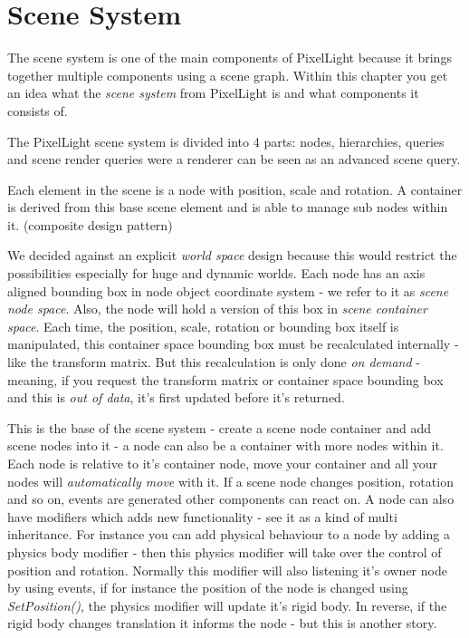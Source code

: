 \section{Scene System}
The scene system is one of the main components of PixelLight because it brings together multiple components using a scene graph. Within this chapter you get an idea what the \emph{scene system} from PixelLight is and what components it consists of.

The PixelLight scene system is divided into 4 parts: nodes, hierarchies, queries and scene render queries were a renderer can be seen as an advanced scene query.

Each element in the scene is a node with position, scale and rotation. A container is derived from this base scene element and is able to manage sub nodes within it. (composite design pattern)

We decided against an explicit \emph{world space} design because this would restrict the possibilities especially for huge and dynamic worlds. Each node has an axis aligned bounding box in node object coordinate system - we refer to it as \emph{scene node space}. Also, the node will hold a version of this box in \emph{scene container space}. Each time, the position, scale, rotation or bounding box itself is manipulated, this container space bounding box must be recalculated internally - like the transform matrix. But this recalculation is only done \emph{on demand} - meaning, if you request the transform matrix or container space bounding box and this is \emph{out of data}, it's first updated before it's returned.

This is the base of the scene system - create a scene node container and add scene nodes into it - a node can also be a container with more nodes within it. Each node is relative to it's container node, move your container and all your nodes will \emph{automatically move} with it. If a scene node changes position, rotation and so on, events are generated other components can react on. A node can also have modifiers which adds new functionality - see it as a kind of multi inheritance. For instance you can add physical behaviour to a node by adding a physics body modifier - then this physics modifier will take over the control of position and rotation. Normally this modifier will also listening it's owner node by using events, if for instance the position of the node is changed using \emph{SetPosition()}, the physics modifier will update it's rigid body. In reverse, if the rigid body changes translation it informs the node - but this is another story.


